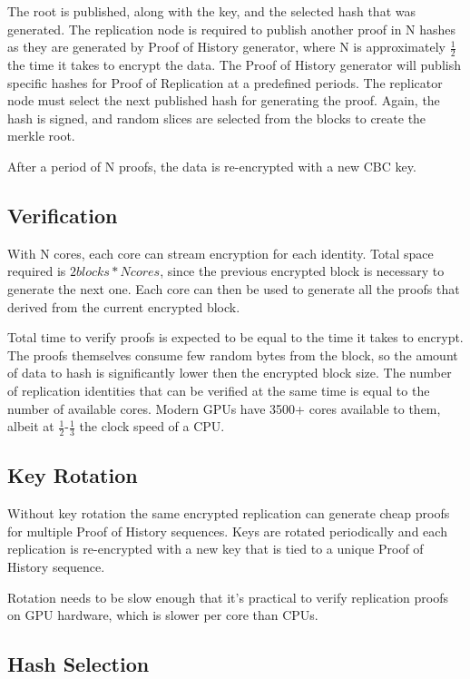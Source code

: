 \documentclass[12pt]{ltjsarticle}
\begin{document}
The root is published, along with the key, and the selected hash that was generated. The replication node is required to publish another proof in N hashes as they are generated by Proof of History generator, where N is approximately \(\frac{1}{2}\) the time it takes to encrypt the data. The Proof of History generator will publish specific hashes for Proof of Replication at a predefined periods. The replicator node must select the next published hash for generating the proof. Again, the hash is signed, and random slices are selected from the blocks to create the merkle root.

After a period of N proofs, the data is re-encrypted with a new CBC key.
\subsection{Verification}

With N cores, each core can stream encryption for each identity. Total space required is \(2 blocks * N cores\), since the previous encrypted block is necessary to generate the next one. Each core can then be used to generate all the proofs that derived from the current encrypted block.

Total time to verify proofs is expected to be equal to the time it takes to encrypt. The proofs themselves consume few random bytes from the block, so the amount of data to hash is significantly lower then the encrypted block size. The number of replication identities that can be verified at the same time is equal to the number of available cores. Modern GPUs have 3500+ cores available to them, albeit at \(\frac{1}{2}\)-\(\frac{1}{3}\) the clock speed of a CPU.

\subsection{Key Rotation}

Without key rotation the same encrypted replication can generate cheap proofs for multiple Proof of History sequences. Keys are rotated periodically and each replication is re-encrypted with a new key that is tied to a unique Proof of History sequence.

Rotation needs to be slow enough that it’s practical to verify replication proofs on GPU hardware, which is slower per core than CPUs.

\subsection{Hash Selection}\label{hashselection}
\end{document}
